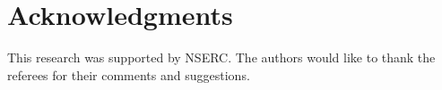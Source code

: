 \documentclass[fleqn]{llncs}
\begin{document}
\section*{Acknowledgments} 

This research was supported by NSERC.  The authors would like to thank
the referees for their comments and suggestions.




\end{document}
